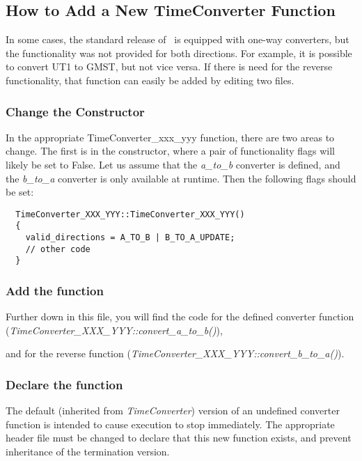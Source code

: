 \subsection{How to Add a New TimeConverter Function}\label{ref:howtoaddanewconverterfunction}
In some cases, the standard release of \JEODid\ is equipped with one-way
converters, but the functionality was not provided for both directions.
 For example, it is possible to convert UT1 to GMST, but not vice
versa.  If there is need for the reverse functionality, that function
can easily be added by editing two files.




\subsubsection{Change the Constructor}
In the appropriate TimeConverter\_xxx\_yyy function, there are two areas
to change.  The first is in the constructor, where a pair of
functionality flags will likely be set to False.  Let us assume that
the \textit{a\_to\_b} converter is defined, and the \textit{b\_to\_a}
converter is only available at runtime.  Then the following flags should be set:

\begin{verbatim}
  TimeConverter_XXX_YYY::TimeConverter_XXX_YYY()
  {
    valid_directions = A_TO_B | B_TO_A_UPDATE;
    // other code
  }
\end{verbatim}

\subsubsection{Add the function}
Further down in this file, you will find the code for the defined
converter function
(\textit{TimeConverter\_XXX\_YYY::convert\_a\_to\_b()}), 

and for the reverse function
(\textit{TimeConverter\_XXX\_YYY::convert\_b\_to\_a()}).




\subsubsection{Declare the function}
The default (inherited from \textit{TimeConverter}) version of an
undefined converter function is intended to cause execution to stop
immediately.  The appropriate header file must be changed to declare
that this new function exists, and prevent inheritance of the
termination version.

